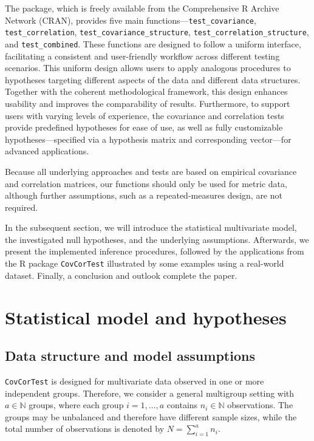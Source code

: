 The package, which is freely available from the Comprehensive R Archive Network
(CRAN), provides five main functions---\texttt{test\_covariance},
\texttt{test\_correlation}, \texttt{test\_covariance\_structure},
\texttt{test\_correlation\_structure}, and \texttt{test\_combined}. These
functions are designed to follow a uniform interface, facilitating a
consistent and user-friendly workflow across different testing scenarios. This
uniform design allows users to apply analogous procedures to hypotheses
targeting different aspects of the data and different data structures.
Together with the coherent methodological framework, this design enhances
usability and improves the comparability of results. Furthermore, to support users with varying levels of experience, the covariance
and correlation tests provide predefined hypotheses for ease of use, as well as
fully customizable hypotheses---specified via a hypothesis matrix and
corresponding vector---for advanced applications.

Because all underlying approaches and tests are based on empirical covariance and correlation
matrices, our functions should only be used for metric data, although further
assumptions, such as a repeated-measures design, are not required.

In the subsequent section, we will introduce the statistical multivariate
model, the investigated null hypotheses, and the underlying assumptions.
Afterwards, we present the implemented inference procedures, followed by the
applications from the R package \texttt{CovCorTest} illustrated by some
examples using a real-world dataset. Finally, a conclusion and outlook
complete the paper.

\section{Statistical model and hypotheses}\label{statistical-model-and-hypotheses}

\subsection{Data structure and model assumptions}\label{data-structure-and-model-assumptions}

\texttt{CovCorTest} is designed for multivariate data observed in one or more
independent groups. Therefore, we consider a general multigroup setting with
\(a \in \mathbb{N}\) groups, where each group \(i = 1, \dots, a\) contains
\(n_i \in \mathbb{N}\) observations. The groups may be unbalanced and therefore
have different sample sizes, while the total number of observations is denoted
by \(N = \sum_{i=1}^a n_i\).

